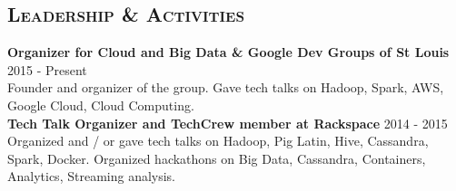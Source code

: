 \begin{resume}






\section{\textsc{Leadership \& Activities}}
\textbf{Organizer for Cloud and Big Data \& Google Dev Groups of St Louis} \hfill 2015 - Present\\
Founder and organizer of the group. Gave tech talks on Hadoop, Spark, AWS, Google Cloud, Cloud Computing.\\
\textbf{Tech Talk Organizer and TechCrew member at Rackspace} \hfill 2014 - 2015\\
Organized and / or gave tech talks on Hadoop, Pig Latin, Hive, Cassandra, Spark, Docker. Organized hackathons on Big Data, Cassandra, Containers, Analytics, Streaming analysis.\\



\end{resume}

